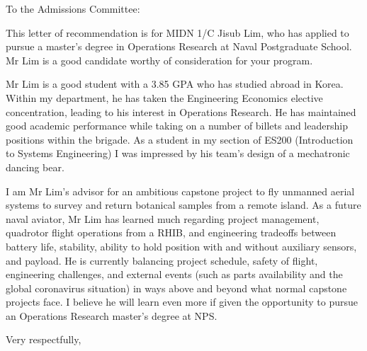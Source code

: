 \documentclass[12pt]{wrceletter}
\date{\today}
\begin{document}
\begin{letter}{%
}

\opening{To the Admissions Committee:}
\raggedright %
\setlength{\parindent}{15pt} %

This letter of recommendation is for MIDN 1/C Jisub Lim, who has applied to pursue a master's degree in Operations Research at Naval Postgraduate School. Mr Lim is a good candidate worthy of consideration for your program. 

Mr Lim is a good student with a 3.85 GPA who has studied abroad in Korea. Within my department, he has taken the Engineering Economics elective concentration, leading to his interest in Operations Research. He has maintained good academic performance while taking on a number of billets and leadership positions within the brigade. As a student in my section of ES200 (Introduction to Systems Engineering) I was impressed by his team's design of a mechatronic dancing bear. 

I am Mr Lim's advisor for an ambitious capstone project to fly unmanned aerial systems to survey and return botanical samples from a remote island. As a future naval aviator, Mr Lim has learned much regarding project management, quadrotor flight operations from a RHIB, and engineering tradeoffs between battery life, stability, ability to hold position with and without auxiliary sensors, and payload. He is currently balancing project schedule, safety of flight, engineering challenges, and external events (such as parts availability and the global coronavirus situation) in ways above and beyond what normal capstone projects face. I believe he will learn even more if given the opportunity to pursue an Operations Research master's degree at NPS. 

\closing{Very respectfully,} %

\end{letter}
\end{document}
